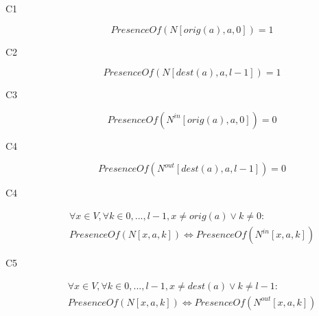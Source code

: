 \documentclass[12pt, a4paper, hidelinks]{article}
\begin{document}
\begin{description}
\item [C1] \begin{equation} PresenceOf(N[orig(a),a,0]) = 1 \end{equation}
\item [C2] \begin{equation} PresenceOf(N[dest(a),a,l-1]) = 1 \end{equation}
\item [C3] \begin{equation} PresenceOf(N^{in}[orig(a),a,0]) = 0 \end{equation}
\item [C4] \begin{equation} PresenceOf(N^{out}[dest(a),a,l-1]) = 0 \end{equation}
\item [C4] \begin{equation}\begin{split} \forall x \in V, \forall k \in {0,...,l-1}, x \neq orig(a) \lor k \neq 0: \\ PresenceOf(N[x,a,k]) \iff PresenceOf(N^{in}[x,a,k]) \end{split}\end{equation} 
\item [C5] \begin{equation}\begin{split} \forall x \in V, \forall k \in {0,...,l-1}, x \neq dest(a) \lor k \neq l-1: \\ PresenceOf(N[x,a,k]) \iff PresenceOf(N^{out}[x,a,k]) \end{split}\end{equation}


\end{description}
\end{document}
